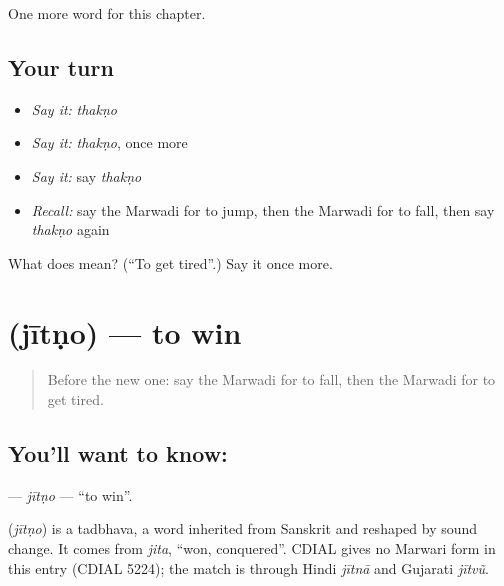 \begin{grammarlens}[title={What you've built}]
One more word for this chapter.
\end{grammarlens}

\subsection*{Your turn}
\begin{itemize}
\raggedright
  \item \emph{Say it:} \emph{thakṇo}
  \item \emph{Say it:} \emph{thakṇo}, once more
  \item \emph{Say it:} say \emph{thakṇo}
  \item \emph{Recall:} say the Marwadi for to jump, then the Marwadi for to fall, then say \emph{thakṇo} again
\end{itemize}

\begin{tcolorbox}[breakable,colback=teal!4,colframe=teal!35!black,title={Before you move on}]
What does  mean? (\textquotedblleft{}To get tired\textquotedblright{}.) Say it once more.
\end{tcolorbox}
\section[\texorpdfstring{\mw{जीतणो} (jītṇo)}{जीतणो (jītṇo)}]{ (jītṇo) — to win}

\label{lesson:MW-C109-jitno}



\begin{quote}
Before the new one: say the Marwadi for to fall, then the Marwadi for to get tired.
\end{quote}

\subsection*{You'll want to know: }
\textbf{} — \emph{jītṇo} — \textquotedblleft{}to win\textquotedblright{}.

\begin{cousinweb}
\textbf{} (\emph{jītṇo}) is a tadbhava, a word inherited from Sanskrit and reshaped by sound change. It comes from \emph{jita}, \textquotedblleft{}won, conquered\textquotedblright{}. CDIAL gives no Marwari form in this entry (CDIAL 5224); the match is through Hindi \emph{jītnā} and Gujarati \emph{jītvũ}.
\end{cousinweb}

